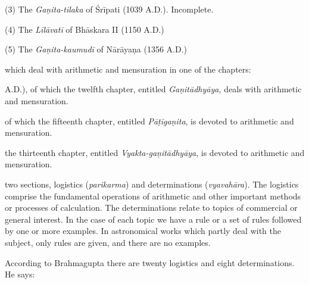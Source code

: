 \documentclass[10pt, openany]{book}
\begin{document}
{{(3) The \textit{Gaṇita-tilaka} of Śrīpati (1039 A.D.). Incomplete.}

{(4) The\textit{ Līlāvatī }of Bhāskara II (1150 A.D.)}

{(5) The \textit{Gaṇita-kaumudī} of Nārāyaṇa (1356 A.D.)}

\vspace{0.3cm}{We also possess the following astronomical works} 
{which deal with arithmetic and mensuration in one of the}
{chapters:}

{A.D.), of which the twelfth chapter, entitled \textit{Gaṇitādhyāya,}}
{deals with arithmetic and mensuration.}

{of which the fifteenth chapter, entitled \textit{Pāṭīgaṇita}, is devoted}
{to arithmetic and mensuration.}

{the thirteenth chapter, entitled \textit{Vyakta-gaṇitādhyāya}, is devoted}
{to arithmetic and mensuration.}

\vspace{0.3cm}{The above works (or chapters) are broadly divided into}
{two sections, logistics (\textit{parikarma}) and determinations (\textit{vyavahāra}).} The logistics comprise the fundamental operations of
{arithmetic and other important methods or processes of calculation.}
{The determinations relate to topics of commercial}
{or general interest. In the case of each topic we have a rule}
{or a set of rules followed by one or more examples. In}
{astronomical works which partly deal with the subject, only rules}
{are given, and there are no examples.}

\newpage

{According to Brahmagupta there are twenty logistics}
{and eight determinations. He says:}


}
\end{document}
